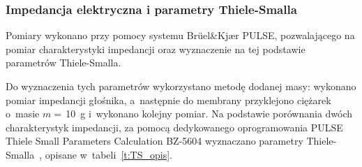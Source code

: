 \documentclass[12pt]{oska}
\begin{document}
		\subsubsection{Impedancja elektryczna i parametry Thiele-Smalla}
			
			Pomiary wykonano przy pomocy systemu Brüel\&Kjær PULSE, pozwalającego na pomiar charakterystyki impedancji oraz wyznaczenie na tej podstawie parametrów Thiele-Smalla.
			
			Do wyznaczenia tych parametrów wykorzystano metodę dodanej masy: wykonano pomiar impedancji głośnika, a~następnie do membrany przyklejono ciężarek o~masie $m=\,$\SI{10}{\gram} i~wykonano kolejny pomiar. Na podstawie porównania dwóch charakterystyk impedancji, za pomocą dedykowanego oprogramowania PULSE Thiele Small Parameters Calculation BZ-5604 wyznaczano parametry Thiele-Smalla~\cite{BK_pulse_TS}, opisane w~tabeli~\ref{t:TS_opis}.
			
\end{document}
